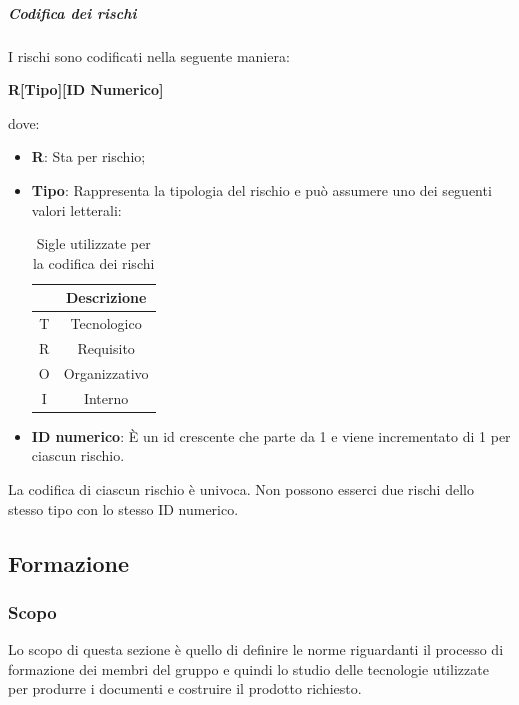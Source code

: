 \subparagraph {Codifica dei rischi}
I rischi sono codificati nella seguente maniera: \\
\begin{center}
  \textbf{\Large{R[Tipo][ID Numerico]}}
\end{center}
dove:
\begin{itemize}[label={}]
  \item \textbf{R}: Sta per rischio;
  \item \textbf{Tipo}: Rappresenta la tipologia del rischio e può assumere uno dei seguenti valori letterali:
        \begin{table}[H]
          \centering
          \renewcommand{\arraystretch}{1.8}
          \begin{tabular}{c|c}
            \rowcolor[HTML]{125E28}
            \multicolumn{1}{c}{\color[HTML]{FFFFFF}\textbf{Sigla}}
              & \multicolumn{1}{c}{\color[HTML]{FFFFFF}\textbf{Descrizione}} \\
            \hline
            T & Tecnologico                                                  \\
            R & Requisito                                                    \\
            O & Organizzativo                                                \\
            I & Interno                                                      \\
          \end{tabular}
          \caption{Sigle utilizzate per la codifica dei rischi}
        \end{table}
  \item \textbf{ID numerico}: È un id crescente che parte da 1 e viene incrementato di 1 per ciascun rischio.\\
\end{itemize}
La codifica di ciascun rischio è univoca. Non possono esserci due rischi dello stesso tipo con lo stesso ID numerico.

\vspace{2cm}

\subsection{Formazione} \label{subsection: formazione}
\subsubsection {Scopo}
Lo scopo di questa sezione è quello di definire le norme riguardanti il processo di formazione dei membri del gruppo \groupName{} e quindi lo studio delle tecnologie utilizzate per produrre i documenti e costruire il prodotto richiesto.
